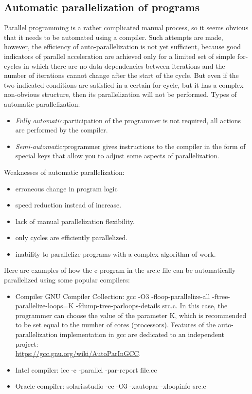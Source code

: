 { %
	\subsection{Automatic parallelization of programs}
	\par Parallel programming is a rather complicated manual process, so it seems obvious that it needs to be automated using a compiler. Such attempts are made, however, the efficiency of auto-parallelization is not yet sufficient, because good indicators of parallel acceleration are achieved only for a limited set of simple for-cycles in which there are no data dependencies between iterations and the number of iterations cannot change after the start of the cycle. But even if the two indicated conditions are satisfied in a certain for-cycle, but it has a complex non-obvious structure, then its parallelization will not be performed. Types of automatic parallelization:
	\begin{itemize}
		\item\textit{Fully automatic:}\quad participation of the programmer is not required, all actions are performed by the compiler.
		\item\textit{Semi-automatic:}\quad programmer gives instructions to the compiler in the form of special keys that allow you to adjust some aspects of parallelization.
	\end{itemize}
	\par Weaknesses of automatic parallelization:
	\begin{itemize}
		\item erroneous change in program logic
		\item speed reduction instead of increase.
		\item lack of manual parallelization flexibility.
		\item only cycles are efficiently parallelized.
		\item inability to parallelize programs with a complex algorithm of work.
	\end{itemize}
	\par Here are examples of how the c-program in the src.c file can be automatically parallelized using some popular compilers:
	\begin{itemize}
		\item Compiler GNU Compiler Collection:	 
gcc -O3 -floop-parallelize-all -ftree-parallelize-loops=K -fdump-tree-parloops-details src.c. In this case, the programmer can choose the value of the parameter K, which is recommended to be set equal to the number of cores (processors). Features of the auto-parallelization implementation in gcc are dedicated to an independent project:\\ \url{https://gcc.gnu.org/wiki/AutoParInGCC}. 
		\item Intel compiler:	 
icc -c -parallel -par-report file.cc
		\item Oracle compiler:	 
solarisstudio -cc -O3 -xautopar -xloopinfo src.c
	\end{itemize}
}